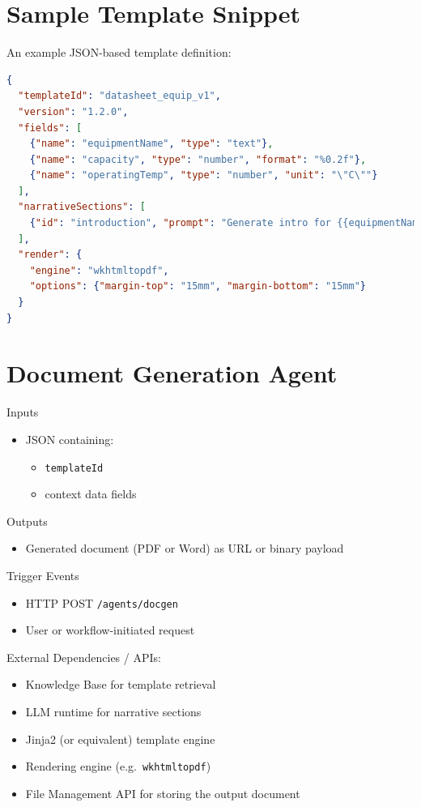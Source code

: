 \documentclass[12pt]{report}
\begin{document}
\section{Sample Template Snippet}
An example JSON-based template definition:
\begin{lstlisting}[language=JSON]
{
  "templateId": "datasheet_equip_v1",
  "version": "1.2.0",
  "fields": [
    {"name": "equipmentName", "type": "text"},
    {"name": "capacity", "type": "number", "format": "%0.2f"},
    {"name": "operatingTemp", "type": "number", "unit": "\"C\""}
  ],
  "narrativeSections": [
    {"id": "introduction", "prompt": "Generate intro for {{equipmentName}} with capacity {{capacity}}."}
  ],
  "render": {
    "engine": "wkhtmltopdf",
    "options": {"margin-top": "15mm", "margin-bottom": "15mm"}
  }
}
\end{lstlisting}

\section{Document Generation Agent}
\begin{description}
  \item Inputs
    \begin{itemize}
      \item JSON containing:
      \begin{itemize}
        \item \texttt{templateId}
        \item context data fields
      \end{itemize}
    \end{itemize}
  \item Outputs
    \begin{itemize}
      \item Generated document (PDF or Word) as URL or binary payload
    \end{itemize}
  \item Trigger Events
    \begin{itemize}
      \item HTTP POST \texttt{/agents/docgen}
      \item User or workflow-initiated request
    \end{itemize}
  \item External Dependencies / APIs:
    \begin{itemize}
      \item Knowledge Base for template retrieval  
      \item LLM runtime for narrative sections  
      \item Jinja2 (or equivalent) template engine  
      \item Rendering engine (e.g.\ \texttt{wkhtmltopdf})  
      \item File Management API for storing the output document  
    \end{itemize}
\end{description}
\end{document}

